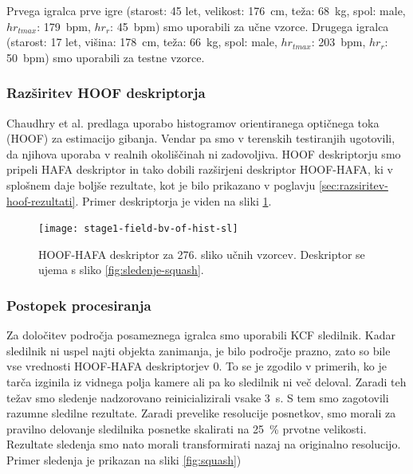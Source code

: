 Prvega igralca prve igre  (starost: 45 let, velikost: \SI{176}{\cm}, teža: \SI{68}{\kg}, spol: male, $hr_{tmax}$: \SI{179}{bpm}, $hr_{r}$: \SI{45}{bpm}) smo uporabili za učne vzorce. Drugega igralca (starost: 17 let, višina: \SI{178}{\cm}, teža: \SI{66}{\kg}, spol: male, $hr_{tmax}$: \SI{203}{bpm}, $hr_{r}$: \SI{50}{bpm}) smo uporabili za testne vzorce. 

\subsubsection{Razširitev HOOF deskriptorja}
Chaudhry et al. \cite{chaudhry2009histograms} predlaga uporabo histogramov orientiranega optičnega toka (HOOF) za estimacijo gibanja. Vendar pa smo v terenskih testiranjih ugotovili, da njihova uporaba v realnih okoliščinah ni zadovoljiva. HOOF deskriptorju smo pripeli HAFA deskriptor in tako dobili razširjeni deskriptor HOOF-HAFA, ki v splošnem daje boljše rezultate, kot je bilo prikazano v poglavju \ref{sec:razsiritev-hoof-rezultati}. Primer deskriptorja je viden na sliki \ref{fig:hoof-hafa}.

\begin{figure}[!htb]
	\centering
	\texttt{[image: stage1-field-bv-of-hist-sl]}
	\caption[HOOF-HAFA deskriptor za 276. sliko učnih vzorcev]{HOOF-HAFA deskriptor za 276. sliko učnih vzorcev. Deskriptor se ujema s sliko \ref{fig:sledenje-squash}.}
	\label{fig:hoof-hafa}
\end{figure}

\subsubsection{Postopek procesiranja}
Za določitev področja posameznega igralca smo uporabili KCF sledilnik. Kadar sledilnik ni uspel najti objekta zanimanja, je bilo področje prazno, zato so bile vse vrednosti HOOF-HAFA deskriptorjev $0$. To se je zgodilo v primerih, ko je tarča izginila iz vidnega polja kamere ali pa ko sledilnik ni več deloval. Zaradi teh težav smo sledenje nadzorovano reinicializirali vsake \SI{3}{\s}. S tem smo zagotovili razumne sledilne rezultate. Zaradi prevelike resolucije posnetkov, smo morali za pravilno delovanje sledilnika posnetke skalirati na \SI{25}{\%} prvotne velikosti. Rezultate sledenja smo nato morali transformirati nazaj na originalno resolucijo. Primer sledenja je prikazan na sliki \ref{fig:squash})

